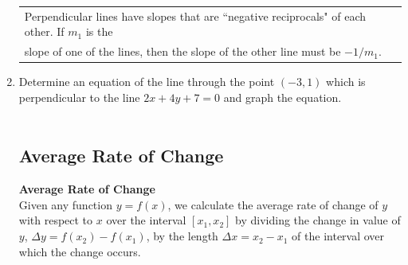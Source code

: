 \begin{enumerate}
\hspace{-.3in}\begin{tabular}{| l |  }
\hline Perpendicular lines have slopes that are ``negative reciprocals" of each other. If $m_1$ is the \\ slope of one of the lines, then the slope of the other line must be $-1/m_1$. \\ \hline
\end{tabular} 

\item Determine an equation of the line through the point $(-3, 1)$ which is perpendicular to the line $2x+4y+7=0$ and graph the equation.\\
\\


\subsection{Average Rate of Change}
\textbf{Average Rate of Change}\\
Given any function $y=f(x)$, we calculate the average rate of change of $y$ with respect to $x$ over the interval  $[x_1,x_2]$ by dividing the change in value of $y$, $\Delta y=f(x_2)-f(x_1)$, by the length  $\Delta x=x_2-x_1$ of the interval over which the change occurs.\\



\end{enumerate}
